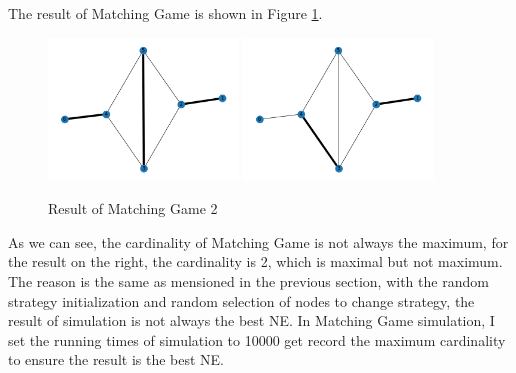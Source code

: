 \documentclass[a4paper, oneside, final, 12pt]{scrartcl} %
\begin{document}
The result of Matching Game is shown in Figure \ref{fig:Result of Matching Game 2}.

\newpage

\begin{figure}[h]
  \centering
  \includegraphics[width=0.45\textwidth]{./image/result_match_game_other.png}
  \includegraphics[width=0.45\textwidth]{./image/result_match_game_other_2.png}
  \caption{Result of Matching Game 2}
  \label{fig:Result of Matching Game 2}
\end{figure}

As we can see, the cardinality of Matching Game is not always the maximum,
for the result on the right, the cardinality is 2, which is maximal but not maximum.
The reason is the same as mensioned in the previous section,
with the random strategy initialization and random selection of nodes to change strategy,
the result of simulation is not always the best NE.
In Matching Game simulation, I set the running times of simulation to 10000 get record the maximum cardinality
to ensure the result is the best NE.

\endgroup
\end{document}
